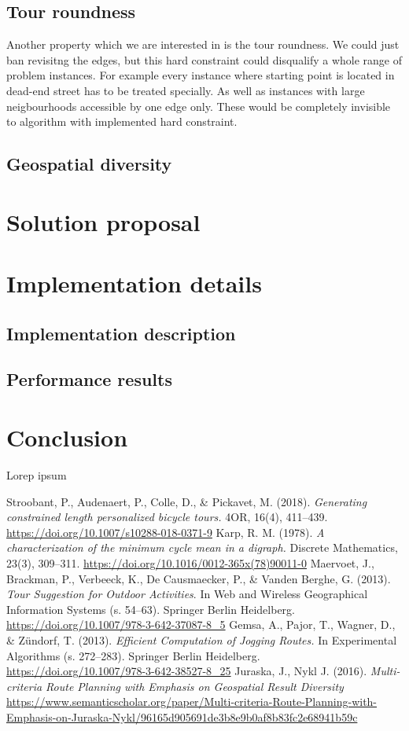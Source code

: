\documentclass{ctuthesis}
\begin{document}
\section{Tour roundness}
Another property which we are interested in is the tour roundness. We could just ban revisitng the edges, but this hard constraint could disqualify a whole range of problem instances. For example every instance where starting point is located in dead-end street has to be treated specially. As well as instances with large neigbourhoods accessible by one edge only. These would be completely invisible to algorithm with implemented hard constraint.

\section{Geospatial diversity}

\chapter{Solution proposal}

\chapter{Implementation details}

\section{Implementation description}

\section{Performance results}

\chapter{Conclusion}
Lorep ipsum \cite{stroobant}
\begin{thebibliography}{1}
Stroobant, P., Audenaert, P., Colle, D., \& Pickavet, M. (2018). \emph{Generating constrained length personalized bicycle tours.} 4OR, 16(4), 411–439. \url{https://doi.org/10.1007/s10288-018-0371-9} 
Karp, R. M. (1978). \emph{A characterization of the minimum cycle mean in a digraph.} Discrete Mathematics, 23(3), 309–311. \url{https://doi.org/10.1016/0012-365x(78)90011-0} 
Maervoet, J., Brackman, P., Verbeeck, K., De Causmaecker, P., \& Vanden Berghe, G. (2013). \emph{Tour Suggestion for Outdoor Activities}. In Web and Wireless Geographical Information Systems (s. 54–63). Springer Berlin Heidelberg. \url{https://doi.org/10.1007/978-3-642-37087-8_5} 
Gemsa, A., Pajor, T., Wagner, D., \& Zündorf, T. (2013). \emph{Efficient Computation of Jogging Routes.} In Experimental Algorithms (s. 272–283). Springer Berlin Heidelberg. \url{https://doi.org/10.1007/978-3-642-38527-8_25} 
 Juraska, J., Nykl J. (2016). \emph{Multi-criteria Route Planning with Emphasis on Geospatial Result Diversity} \url{https://www.semanticscholar.org/paper/Multi-criteria-Route-Planning-with-Emphasis-on-Juraska-Nykl/96165d905691de3b8e9b0af8b83fc2e68941b59c}
\end{thebibliography}
\end{document}
